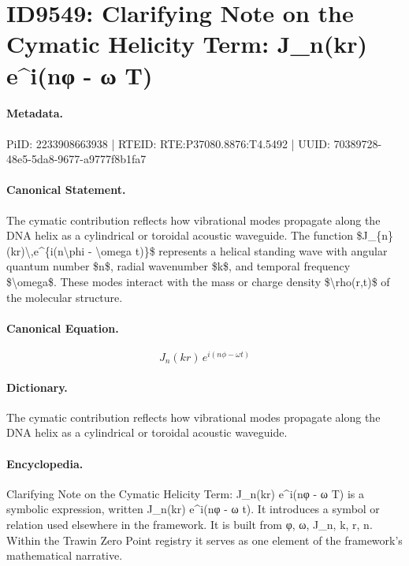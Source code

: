 \section*{ID9549: Clarifying Note on the Cymatic Helicity Term: J\_n(kr) e\textasciicircum{}i(nφ - ω T)}
\paragraph{Metadata.}
PiID: 2233908663938 | RTEID: RTE:P37080.8876:T4.5492 | UUID: 70389728-48e5-5da8-9677-a9777f8b1fa7

\paragraph{Canonical Statement.}
The cymatic contribution reflects how vibrational modes propagate along the DNA helix as a cylindrical or toroidal acoustic waveguide. The function \$J\_\{n\}(kr)\textbackslash{},e\textasciicircum{}\{i(n\textbackslash{}phi - \textbackslash{}omega t)\}\$ represents a helical standing wave with angular quantum number \$n\$, radial wavenumber \$k\$, and temporal frequency \$\textbackslash{}omega\$. These modes interact with the mass or charge density \$\textbackslash{}rho(r,t)\$ of the molecular structure.

\paragraph{Canonical Equation.}
\[
J_{n}(kr)\,e^{i(n\phi - \omega t)}
\]

\paragraph{Dictionary.}
The cymatic contribution reflects how vibrational modes propagate along the DNA helix as a cylindrical or toroidal acoustic waveguide.

\paragraph{Encyclopedia.}
Clarifying Note on the Cymatic Helicity Term: J\_n(kr) e\textasciicircum{}i(nφ - ω T) is a symbolic expression, written J\_n(kr) e\textasciicircum{}i(nφ - ω t). It introduces a symbol or relation used elsewhere in the framework. It is built from φ, ω, J\_n, k, r, n. Within the Trawin Zero Point registry it serves as one element of the framework's mathematical narrative.
